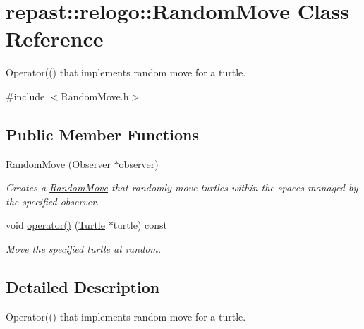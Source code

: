 \hypertarget{classrepast_1_1relogo_1_1_random_move}{\section{repast\-:\-:relogo\-:\-:Random\-Move Class Reference}
\label{classrepast_1_1relogo_1_1_random_move}
}


Operator(() that implements random move for a turtle.  




{\ttfamily \#include $<$Random\-Move.\-h$>$}

\subsection*{Public Member Functions}
\begin{DoxyCompactItemize}
\item 
\hyperlink{classrepast_1_1relogo_1_1_random_move_a7fcb5ce02c9662176f7fab7cbb26f684}{Random\-Move} (\hyperlink{classrepast_1_1relogo_1_1_observer}{Observer} $\ast$observer)
\begin{DoxyCompactList}\small\item\em Creates a \hyperlink{classrepast_1_1relogo_1_1_random_move}{Random\-Move} that randomly move turtles within the spaces managed by the specified observer. \end{DoxyCompactList}\item 
void \hyperlink{classrepast_1_1relogo_1_1_random_move_ad6273ded4033465519583ba5f57cbe21}{operator()} (\hyperlink{classrepast_1_1relogo_1_1_turtle}{Turtle} $\ast$turtle) const 
\begin{DoxyCompactList}\small\item\em Move the specified turtle at random. \end{DoxyCompactList}\end{DoxyCompactItemize}


\subsection{Detailed Description}
Operator(() that implements random move for a turtle. 

